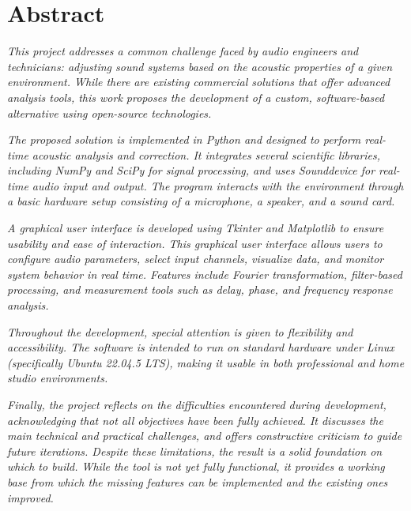 \chapter*{Abstract}



\textit{This project addresses a common challenge faced by audio engineers and technicians: adjusting sound systems based on the acoustic properties of a given environment. While there are existing commercial solutions that offer advanced analysis tools, this work proposes the development of a custom, software-based alternative using open-source technologies.}
	
\textit{The proposed solution is implemented in Python and designed to perform real-time acoustic analysis and correction. It integrates several scientific libraries, including NumPy and SciPy for signal processing, and uses Sounddevice for real-time audio input and output. The program interacts with the environment through a basic hardware setup consisting of a microphone, a speaker, and a sound card.}
	
\textit{A graphical user interface is developed using Tkinter and Matplotlib to ensure usability and ease of interaction. This graphical user interface allows users to configure audio parameters, select input channels, visualize data, and monitor system behavior in real time. Features include Fourier transformation, filter-based processing, and measurement tools such as delay, phase, and frequency response analysis.}
	
\textit{Throughout the development, special attention is given to flexibility and accessibility. The software is intended to run on standard hardware under Linux (specifically Ubuntu 22.04.5 LTS), making it usable in both professional and home studio environments.}

\textit{Finally, the project reflects on the difficulties encountered during development, acknowledging that not all objectives have been fully achieved. It discusses the main technical and practical challenges, and offers constructive criticism to guide future iterations. Despite these limitations, the result is a solid foundation on which to build. While the tool is not yet fully functional, it provides a working base from which the missing features can be implemented and the existing ones improved.}

